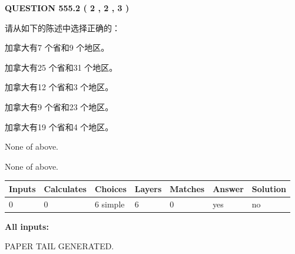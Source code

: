 \documentclass{ctexart}
\begin{document}
   
  
\vspace{0.2in}
  
{\textbf{\Large{QUESTION
555.2 
 ( 2 , 2 , 3 )
}}}
  
  
请从如下的陈述中选择正确的：
 
 
加拿大有7 个省和9 个地区。
 
 
加拿大有25 个省和31 个地区。
 
 
加拿大有12 个省和3 个地区。
 
 
加拿大有9 个省和23 个地区。
 
 
加拿大有19 个省和4 个地区。
 
 
 None of above.
 
 
\noindent{}
 
 
 None of above.
 
 
\noindent{}
 
 
   
   
   
   
\noindent\begin{tabular}{|l|l|l|l|l|l|l|}
 \hline
Inputs & Calculates & Choices & Layers & Matches & Answer & Solution \\ \hline
 0  & 
 0  & 
 6
  simple  
  & 
 6  & 
 0  & 
  yes & 
  no 
  \\ \hline
 \end{tabular}
   
   
   
   
\noindent{}
   
   
   
   
\noindent\vspace{0.1in}\hspace{-0.08in} {\textbf{\Large{All inputs: }}}
   
   
   
   
   
   
 \vspace{0.2in}
 
   
   
\vspace{2.0in} PAPER TAIL GENERATED.
   
\end{document}
